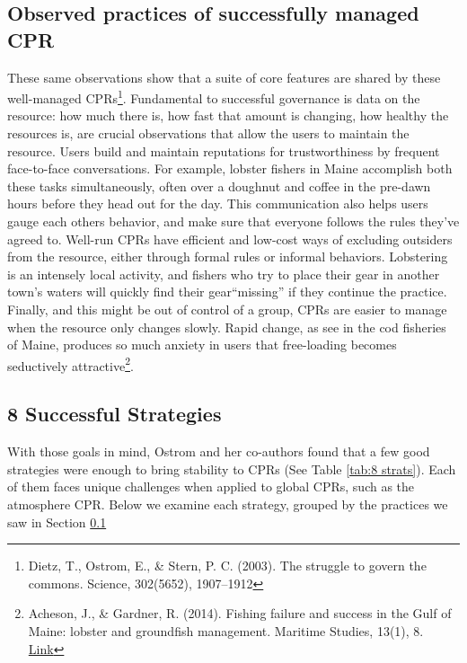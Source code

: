 \documentclass[amstex,12pt]{book}
\begin{document}
\subsection{Observed practices of successfully managed CPR}\label{practices}
These same observations show that a suite of core features are shared by these well-managed CPRs\footnote{Dietz, T., Ostrom, E., \& Stern, P. C. (2003). The struggle to govern the commons. Science, 302(5652), 1907–1912}. Fundamental to successful governance is data on the resource: how much there is, how fast that amount is changing, how healthy the resources is, are crucial observations that allow the users to maintain the resource. Users build and maintain reputations for trustworthiness by frequent face-to-face conversations. For example, lobster fishers in Maine accomplish both these tasks simultaneously, often over a doughnut and coffee in the pre-dawn hours before they head out for the day. This communication also helps users gauge each others behavior, and make sure that everyone follows the rules they've agreed to. Well-run CPRs have efficient and low-cost ways of excluding outsiders from the resource, either through formal rules or informal behaviors. Lobstering is an intensely local activity, and fishers who try to place their gear in another town's waters will quickly find their gear``missing'' if they continue the practice. Finally, and this might be out of control of a group, CPRs are easier to manage when the resource only changes slowly. Rapid change, as see in the cod fisheries of Maine, produces so much anxiety in users that free-loading becomes seductively attractive\footnote{Acheson, J., \& Gardner, R. (2014). Fishing failure and success in the Gulf of Maine: lobster and groundfish management. Maritime Studies, 13(1), 8. \href{https://doi.org/10.1186/2212-9790-13-8}{Link}}. 
   
\subsection{8 Successful Strategies}\label{no_toc}
With those goals in mind, Ostrom and her co-authors found that a few good strategies were enough to bring stability to CPRs (See Table \ref{tab:8 strats}). Each of them faces unique challenges when applied to global CPRs, such as the atmosphere CPR. Below we examine each strategy, grouped by the practices we saw in Section \ref{practices}
\end{document}
